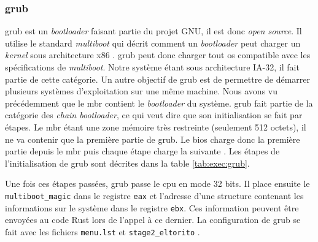 \subsubsection{\acrshort{grub}}
\acrshort{grub} est un \textit{bootloader} faisant partie du projet GNU, il est
donc \textit{open source}. Il utilise le standard \textit{multiboot} qui décrit
comment un \textit{bootloader} peut charger un \textit{kernel} sous architecture
x86 \cite{ref12}. \acrshort{grub} peut donc charger tout \acrshort{os} compatible
avec les spécifications de \textit{multiboot}. Notre système étant sous architecture
\acrshort{IA-32}, il fait partie de cette catégorie. Un autre objectif de \acrshort{grub}
est de permettre de démarrer plusieurs systèmes d'exploitation sur une même machine.
Nous avons vu précédemment que le \acrshort{mbr} contient le \textit{bootloader}
du système. \acrshort{grub} fait partie de la catégorie des \textit{chain bootloader},
ce qui veut dire que son initialisation se fait par étapes. Le \acrshort{mbr}
étant une zone mémoire très restreinte (seulement 512 octets), il ne va contenir
que la première partie de \acrshort{grub}. Le \acrshort{bios} charge donc la première
partie depuis le \acrshort{mbr} puis chaque étape charge la suivante \cite{ref42}.
Les étapes de l'initialisation de \acrshort{grub} sont décrites dans la table
\ref{tab:exec:grub}.

\begin{center}
    \label{tab:exec:grub}
\end{center}

Une fois ces étapes passées, \acrshort{grub} passe le \acrshort{cpu} en mode
32 bits. Il place ensuite le \texttt{multiboot_magic} dans le registre
\texttt{eax} et l'adresse d'une structure contenant les informations sur
le système dans le registre \texttt{ebx}. Ces information peuvent être
envoyées au code Rust lors de l'appel à ce dernier. La configuration de \acrshort{grub}
se fait avec les fichiers \texttt{menu.lst} et \texttt{stage2_eltorito}
\cite{ref42}.

